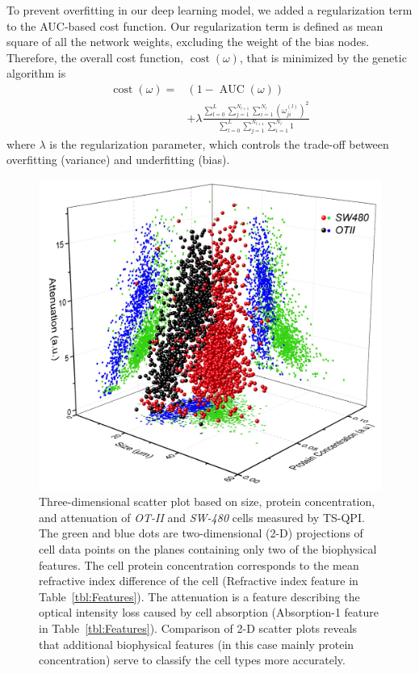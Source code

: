 \documentclass[aps,pra,reprint,superscriptaddress]{revtex4-1}
\DeclareMathOperator{\AUC}{AUC} %
\DeclareMathOperator{\cost}{cost} %
\begin{document}
To prevent overfitting in our deep learning model, we added a regularization term to the AUC-based cost function. Our regularization term is defined as mean square of all the network weights, excluding the weight of the bias nodes. Therefore, the overall cost function, $\cost(\omega)$, that is minimized by the genetic algorithm is
\begin{equation}
\begin{split}
\cost(\omega) = & (1 - \AUC(\omega)) \\
& + \lambda \frac{\sum_{l=0}^{L} \sum_{j=1}^{N_{l+1}} \sum_{i=1}^{N_l} (\omega_{ji}^{(l)})^2}{\sum_{l=0}^{L} \sum_{j=1}^{N_{l+1}} \sum_{i=1}^{N_l} 1}
\end{split}
\end{equation}
where $\lambda$ is the regularization parameter, which controls the trade-off between overfitting (variance) and underfitting (bias).

\begin{figure}
\includegraphics[scale=0.2]{FigureOTSWScatter.jpg}
\caption{\label{fig:OTSWScatter} Three-dimensional scatter plot based on size, protein concentration, and attenuation of \textit{OT-II} and \textit{SW-480} cells measured by TS-QPI. The green and blue dots are two-dimensional (2-D) projections of cell data points on the planes containing only two of the biophysical features. The cell protein concentration corresponds to the mean refractive index difference of the cell (Refractive index feature in Table~\ref{tbl:Features}). The attenuation is a feature describing the optical intensity loss caused by cell absorption (Absorption-1 feature in Table~\ref{tbl:Features}). Comparison of 2-D scatter plots reveals that additional biophysical features (in this case mainly protein concentration) serve to classify the cell types more accurately.}
\end{figure}
\end{document}
